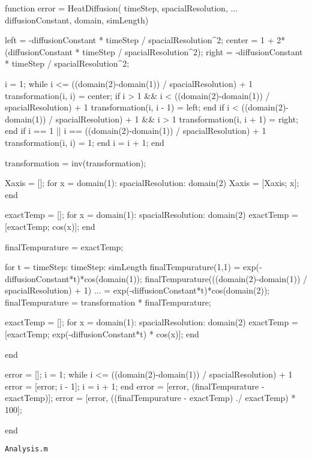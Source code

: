 \documentclass[12pt]{article}
\begin{document}
\begin{verbatimtab}
function error = HeatDiffusion( timeStep, spacialResolution, ...
                                           diffusionConstant, domain, simLength)

    left = -diffusionConstant * timeStep / spacialResolution^2;
    center = 1 + 2*(diffusionConstant * timeStep / spacialResolution^2);
    right = -diffusionConstant * timeStep / spacialResolution^2;

    i = 1;
    while i <= ((domain(2)-domain(1)) / spacialResolution) + 1
        transformation(i, i) = center;
        if i > 1 && i < ((domain(2)-domain(1)) / spacialResolution) + 1
            transformation(i, i - 1) = left;
        end
        if i < ((domain(2)-domain(1)) / spacialResolution) + 1 && i > 1
            transformation(i, i + 1) = right;
        end
        if i == 1 || i == ((domain(2)-domain(1)) / spacialResolution) + 1
            transformation(i, i) = 1;
        end
        i = i + 1;
    end

    transformation = inv(transformation);
    
    Xaxis = [];
    for x = domain(1): spacialResolution: domain(2)
        Xaxis = [Xaxis; x];
    end

    exactTemp = [];
    for x = domain(1): spacialResolution: domain(2)
        exactTemp = [exactTemp; cos(x)];
    end
    
    finalTempurature = exactTemp;

    for t = timeStep: timeStep: simLength
        finalTempurature(1,1) = exp(-diffusionConstant*t)*cos(domain(1));
        finalTempurature(((domain(2)-domain(1)) / spacialResolution) + 1) ...
                        = exp(-diffusionConstant*t)*cos(domain(2));
        finalTempurature = transformation * finalTempurature;
        
        exactTemp = [];
        for x = domain(1): spacialResolution: domain(2)
            exactTemp = [exactTemp; exp(-diffusionConstant*t) * cos(x)];
        end

    end
    
    error = [];
    i = 1;
    while i <= ((domain(2)-domain(1)) / spacialResolution) + 1
        error = [error; i - 1];
        i = i + 1;
    end
    error = [error, (finalTempurature - exactTemp)];
    error = [error, ((finalTempurature - exactTemp) ./ exactTemp) * 100];

end
\end{verbatimtab}
\clearpage
\texttt{Analysis.m}
\end{document}
